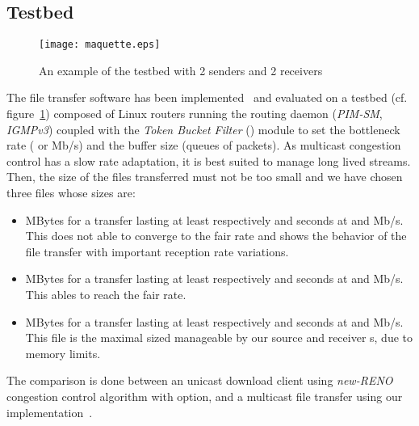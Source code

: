 \documentclass[a4paper]{article}
\begin{document}
    \subsection{Testbed}
        \begin{figure}[t]
            \centering
\texttt{[image: maquette.eps]}
            \caption{An example of the testbed with 2 senders and 2 receivers}
            \label{fig:testbed}
        \end{figure}
        The file transfer software has been implemented~\cite{_mutual:_2009} and
        evaluated on a testbed (cf.  figure~\ref{fig:testbed}) composed of Linux
        routers running the  routing daemon (\textit{PIM-SM},
                \textit{IGMPv3}) coupled with the \textit{Token Bucket Filter}
        () module to set the bottleneck rate ( or  Mb/s) and the
        buffer size (queues of  packets).
As multicast congestion control has a slow rate adaptation, it is best
        suited to manage long lived streams. Then, the size of the files
        transferred must not be too small and we have chosen three files whose
        sizes are:
        \begin{itemize}
            \item{
                 MBytes for a transfer lasting at least respectively  and
                     seconds at  and  Mb/s.  This does not able 
                    to converge to the fair rate and shows the behavior of the
                    file transfer with important reception rate variations.
            }
            \item{
                 MBytes for a transfer lasting at least respectively 
                    and  seconds at  and  Mb/s. This ables  to
                    reach the fair rate.
            }
            \item{
                 MBytes for a transfer lasting at least respectively 
                    and  seconds at  and  Mb/s.  This file is the
                    maximal sized manageable by our source and receiver s,
                            due to memory limits.
            }
        \end{itemize}
        The comparison is done between an unicast download client using 
        \textit{\mbox{new-RENO}} congestion control algorithm with 
        option, and a multicast file transfer using our
        implementation~\cite{_mutual:_2009}.
\end{document}
